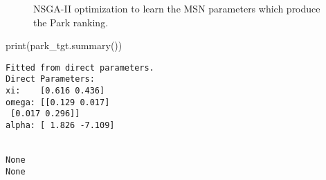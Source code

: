 \documentclass[
  letterpaper,
  DIV=11,
  numbers=noendperiod]{scrartcl}
\newenvironment{Shaded}{\begin{snugshade}}{\end{snugshade}}
\newcommand{\BuiltInTok}[1]{\textcolor[rgb]{0.00,0.23,0.31}{#1}}
\newcommand{\NormalTok}[1]{\textcolor[rgb]{0.00,0.23,0.31}{#1}}
\begin{document}
\begin{figure}

\begin{minipage}{0.50\linewidth}



\end{minipage}%
%
\begin{minipage}{0.50\linewidth}



\end{minipage}%

\caption{\label{fig-pymoo-parks}NSGA-II optimization to learn the MSN
parameters which produce the Park ranking.}

\end{figure}%

\begin{Shaded}
\begin{Highlighting}[]
\BuiltInTok{print}\NormalTok{(park\_tgt.summary())}
\end{Highlighting}
\end{Shaded}

\begin{verbatim}
Fitted from direct parameters.
Direct Parameters:
xi:    [0.616 0.436]
omega: [[0.129 0.017]
 [0.017 0.296]]
alpha: [ 1.826 -7.109]


None
None
\end{verbatim}
\end{document}
